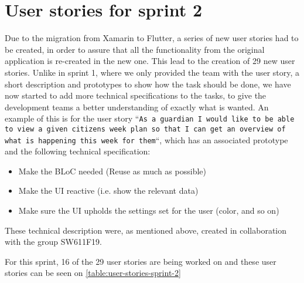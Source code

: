 \section{User stories for sprint 2}
Due to the migration from Xamarin to Flutter, a series of new user stories had to be created, in order to assure that all the functionality from the original application is re-created in the new one.
This lead to the creation of 29 new user stories.
Unlike in sprint 1, where we only provided the team with the user story, a short description and prototypes to show how the task should be done, we have now started to add more technical specifications to the tasks, to give the development teams a better understanding of exactly what is wanted.
An example of this is for the user story ``\texttt{As a guardian I would like to be able to view a given citizens week plan so that I can get an overview of what is happening this week for them}``, which has an associated prototype and the following technical specification:

\begin{itemize}
    \item Make the BLoC needed (Reuse as much as possible)
    \item Make the UI reactive (i.e. show the relevant data)
    \item Make sure the UI upholds the settings set for the user (color, and so on)
\end{itemize}
These technical description were, as mentioned above, created in collaboration with the group SW611F19.


\noindent For this sprint, 16 of the 29 user stories are being worked on and these user stories can be seen on \autoref{table:user-stories-sprint-2}

